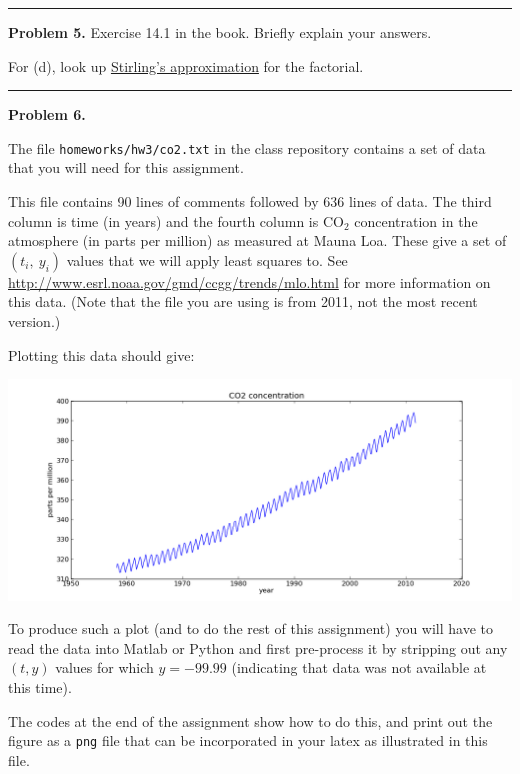 \documentclass[10pt]{article}
\begin{document}

\vskip 1cm
\hrule
{\bf Problem 5.}
Exercise 14.1 in the book.  Briefly explain your answers.

For (d), look up 
\href{https://en.wikipedia.org/wiki/Stirling%27s_approximation}{Stirling's
approximation} for the factorial.



\vskip 1cm
\hrule
{\bf Problem 6.}

The file {\tt homeworks/hw3/co2.txt} in the class repository
contains a set of data that you will need for this assignment.  

This file contains 90 lines of comments
followed by 636 lines of data.  The third column is time (in years) and the
fourth column is CO$_2$ concentration in the atmosphere (in parts per
million) as measured at Mauna Loa.  These give a set of $(t_i,~y_i)$ values
that we will apply least squares to.
See \url{http://www.esrl.noaa.gov/gmd/ccgg/trends/mlo.html}
for more information on this data.  
(Note that the file you are using is from 2011, not the most recent version.)

Plotting this data should give:

\centerline{\includegraphics[width=5.5in]{co2figure.png}}

\vskip 5pt
To produce such a plot (and to do the rest of this assignment) you will have
to read the data into Matlab or Python and first pre-process it by stripping
out any $(t,y)$ values for which $y = -99.99$ (indicating that data was not
available at this time).

The codes at the end of the assignment 
show how to do this, and print out the figure as
a {\tt png} file that can be incorporated in your latex as illustrated in
this file.
\end{document}
